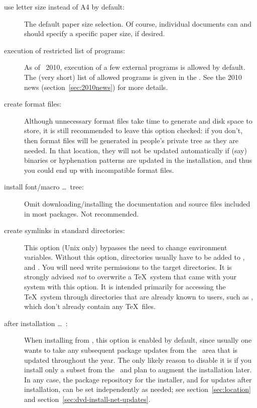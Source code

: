 \documentclass{article}
\begin{document}
\begin{description}
\item[use letter size instead of A4 by default:] The default paper
  size selection.  Of course, individual documents can and should
  specify a specific paper size, if desired.

\item[execution of restricted list of programs:] As of \TL\ 2010,
  execution of a few external programs is allowed by default.  The (very
  short) list of allowed programs is given in the .
  See the 2010 news (section~\ref{sec:2010news}) for more details.

\item[create format files:] Although unnecessary format files
  take time to generate and disk space to store, it is still recommended
  to leave this option checked: if you don't, then format files will be
  generated in people's private  tree as they are
  needed.  In that location, they will not be updated automatically if
  (say) binaries or hyphenation patterns are updated in the
  installation, and thus you could end up with incompatible format files.

\item[install font/macro \ldots\ tree:] Omit downloading/installing the
  documentation and source files included in most packages.  Not recommended.

\item[create symlinks in standard directories:]
  This option (Unix only) bypasses the need to change environment
  variables. Without this option, \TL{} directories usually have to be
  added to ,  and . You
  will need write permissions to the target directories.  It is strongly
  advised \emph{not} to overwrite a \TeX\ system that came with your
  system with this option.  It is intended primarily for accessing the
  \TeX\ system through directories that are already known to users, such
  as , which don't already contain any \TeX\
  files.

\item[after installation \ldots\ \CTAN:] When installing from \DVD, this
  option is enabled by default, since usually one wants to take any
  subsequent package updates from the \CTAN\ area that is updated
  throughout the year.  The only likely reason to disable it is if you
  install only a subset from the \DVD\ and plan to augment the
  installation later.  In any case, the package repository for the
  installer, and for updates after installation, can be set
  independently as needed; see section~\ref{sec:location} and
  section~\ref{sec:dvd-install-net-updates}.
\end{description}
\end{document}

